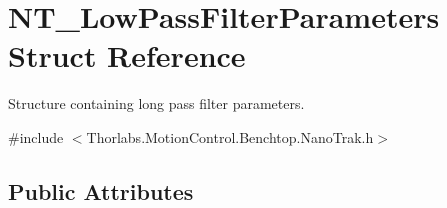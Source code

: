 \hypertarget{struct_n_t___low_pass_filter_parameters}{}\section{N\+T\+\_\+\+Low\+Pass\+Filter\+Parameters Struct Reference}
\label{struct_n_t___low_pass_filter_parameters}


Structure containing long pass filter parameters.  




{\ttfamily \#include $<$Thorlabs.\+Motion\+Control.\+Benchtop.\+Nano\+Trak.\+h$>$}

\subsection*{Public Attributes}
